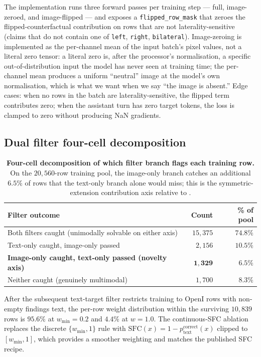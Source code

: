 \documentclass{article}
\begin{document}
The implementation runs three forward passes per training step --- full,
image-zeroed, and image-flipped --- and exposes a
\texttt{flipped\_row\_mask} that zeroes the flipped-counterfactual
contribution on rows that are not laterality-sensitive (claims that do
not contain one of \texttt{left}, \texttt{right}, \texttt{bilateral}).
Image-zeroing is implemented as the per-channel mean of the input batch's
pixel values, not a literal zero tensor: a literal zero is, after the
processor's normalisation, a specific out-of-distribution input the model
has never seen at training time; the per-channel mean produces a uniform
``neutral'' image at the model's own normalisation, which is what we want
when we say ``the image is absent.'' Edge cases: when no rows in the
batch are laterality-sensitive, the flipped term contributes zero; when
the assistant turn has zero target tokens, the loss is clamped to zero
without producing NaN gradients.

\subsection{Dual filter four-cell decomposition}
\label{app:filter}

\begin{table}[t]
\centering
\small
\caption{\textbf{Four-cell decomposition of which filter branch flags each
training row.} On the $20{,}560$-row training pool, the image-only branch
catches an additional $6.5\%$ of rows that the text-only branch alone
would miss; this is the symmetric-extension contribution axis relative to
\citet{li2025sfc}.}
\label{tab:filter-decomp}
\begin{tabular}{lrr}
\toprule
\textbf{Filter outcome} & \textbf{Count} & \textbf{\% of pool}\\
\midrule
Both filters caught (unimodally solvable on either axis) & $15{,}375$ & $74.8\%$\\
Text-only caught, image-only passed                       & $\phantom{0}2{,}156$  & $10.5\%$\\
\textbf{Image-only caught, text-only passed (novelty axis)} & $\phantom{0}\mathbf{1{,}329}$  & $\mathbf{6.5}\%$\\
Neither caught (genuinely multimodal)                     & $\phantom{0}1{,}700$  & $\phantom{0}8.3\%$\\
\bottomrule
\end{tabular}
\end{table}

After the subsequent text-target filter restricts training to OpenI rows
with non-empty findings text, the per-row weight distribution within the
surviving $10{,}839$ rows is $95.6\%$ at $w_{\min}=0.2$ and $4.4\%$ at
$w=1.0$. The continuous-SFC ablation replaces the discrete
$\{w_{\min}, 1\}$ rule with $\mathrm{SFC}(x) = 1 - p_{\text{text}}^{\text{correct}}(x)$
clipped to $[w_{\min}, 1]$, which provides a smoother weighting and
matches the published SFC recipe.
\end{document}
